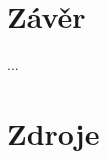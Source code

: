 \documentclass[11pt,a4paper]{article}
\begin{document}
	\section{Závěr}
		...


	\section{Zdroje}

	
\end{document}
